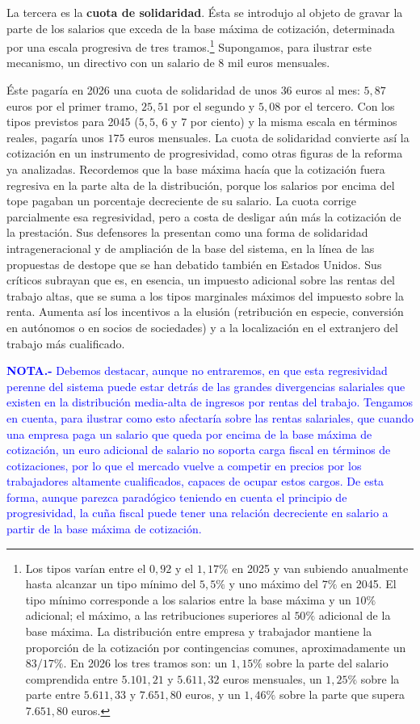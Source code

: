 \documentclass[10pt,a4paper]{article}
\begin{document}
La tercera es la \textbf{cuota de solidaridad}. Ésta se introdujo al objeto de gravar la parte de los salarios que exceda de la base máxima de cotización, determinada por una escala progresiva de tres tramos.\footnote{%
    Los tipos varían entre el $0,92$ y el $1,17\%$ en 2025 y van subiendo anualmente hasta alcanzar un tipo mínimo del $5,5\%$ y uno máximo del $7\%$ en 2045. El tipo mínimo corresponde a los salarios entre la base máxima y un $10\%$ adicional; el máximo, a las retribuciones superiores al $50\%$ adicional de la base máxima. La distribución entre empresa y trabajador mantiene la proporción de la cotización por contingencias comunes, aproximadamente un $83/17\%$. En 2026 los tres tramos son: un $1,15\%$ sobre la parte del salario comprendida entre $5{.}101,21$ y $5{.}611,32$ euros mensuales, un $1,25\%$ sobre la parte entre $5{.}611,33$ y $7{.}651,80$ euros, y un $1,46\%$ sobre la parte que supera $7{.}651,80$ euros.
} Supongamos, para ilustrar este mecanismo, un directivo con un salario de $8$ mil euros mensuales. 

Éste pagaría en 2026 una cuota de solidaridad de unos $36$ euros al mes: $5,87$ euros por el primer tramo, $25,51$ por el segundo y $5,08$ por el tercero. Con los tipos previstos para 2045 ($5,5$, $6$ y $7$ por ciento) y la misma escala en términos reales, pagaría unos $175$ euros mensuales. La cuota de solidaridad convierte así la cotización en un instrumento de progresividad, como otras figuras de la reforma ya analizadas. Recordemos que la base máxima hacía que la cotización fuera regresiva en la parte alta de la distribución, porque los salarios por encima del tope pagaban un porcentaje decreciente de su salario. La cuota corrige parcialmente esa regresividad, pero a costa de desligar aún más la cotización de la prestación. Sus defensores la presentan como una forma de solidaridad intrageneracional y de ampliación de la base del sistema, en la línea de las propuestas de destope que se han debatido también en Estados Unidos. Sus críticos subrayan que es, en esencia, un impuesto adicional sobre las rentas del trabajo altas, que se suma a los tipos marginales máximos del impuesto sobre la renta. Aumenta así los incentivos a la elusión (retribución en especie, conversión en autónomos o en socios de sociedades) y a la localización en el extranjero del trabajo más cualificado.

\textcolor{blue}{\textbf{NOTA.-} Debemos destacar, aunque no entraremos, en que esta regresividad perenne del sistema puede estar detrás de las grandes divergencias salariales que existen en la distribución media-alta de ingresos por rentas del trabajo. Tengamos en cuenta, para ilustrar como esto afectaría sobre las rentas salariales, que cuando una empresa paga un salario que queda por encima de la base máxima de cotización, un euro adicional de salario no soporta carga fiscal en términos de cotizaciones, por lo que el mercado vuelve a competir en precios por los trabajadores altamente cualificados, capaces de ocupar estos cargos. De esta forma, aunque parezca paradógico teniendo en cuenta el principio de progresividad, la cuña fiscal puede tener una relación decreciente en salario a partir de la base máxima de cotización.} 
\end{document}
